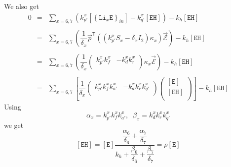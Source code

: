 \documentclass[aps,onecolumn,11pt]{revtex4}
\newcommand{\mychem}[1]{\mathtt{#1}}
\newcommand{\myconc}[1]{\left\lbrack{#1}\right\rbrack}
\newcommand{\LiEin}[1]{\myconc{\left\lbrace\mychem{Li}_{#1}\mychem{E}\right\rbrace_{in}}}
\newcommand{\EHin}{\myconc{\mychem{EH}}}
\newcommand{\Eout}{\myconc{\mychem{E}}}
\newcommand{\mytrn}[1]{{#1}^{\mathsf{T}}}
\begin{document}
We also get
\begin{equation}
	\begin{array}{rcl}
	0 & = & \displaystyle\sum_{x=6,7}\left( k_{p'}^x \LiEin{x} - k_{q'}^x \EHin \right) - k_h \EHin\\
	\\
	  & = & \displaystyle\sum_{x=6,7}\left(\dfrac{1}{\delta_x} \mytrn{\vec{p}} 
	  \left(
	  	(k_{p'}^xS_x - \delta_x I_2) \kappa_x
	  \right) \vec{\mathcal{E}} \right) - k_h \EHin\\
	  \\
	  & = & \displaystyle\sum_{x=6,7}\left( \dfrac{1}{\delta_x} 
	  \begin{pmatrix}
	  k_{p'}^x k_f^x & -k_d^x k_r^x\\
	  \end{pmatrix}
	  \kappa_x\vec{\mathcal{E}} 
	  \right)- k_h \EHin\\
	  \\
	  & = & \displaystyle\sum_{x=6,7} \left\lbrack \dfrac{1}{\delta_x}
	  \begin{pmatrix}
	  k_{p'}^x k_f^x k_{a'}^x & -k_d^x k_r^x k_{q'}^x\\
	  \end{pmatrix} 
	  \begin{pmatrix}
	  \Eout\\
	  \EHin\\
	  \end{pmatrix}
	  \right\rbrack - k_h \EHin
	\end{array}
\end{equation}
Using
\begin{equation}
	\alpha_x = k_{p'}^x k_f^x k_{a'}^x,\;\;\beta_x=k_d^x k_r^x k_{q'}^x
\end{equation}
we get
\begin{equation}
	\EHin = \Eout
	\dfrac{\dfrac{\alpha_6}{\delta_6}+\dfrac{\alpha_7}{\delta_7}}
	{k_h+\dfrac{\beta_6}{\delta_6}+\dfrac{\beta_7}{\delta_7}}
	= \rho \Eout
\end{equation}
\end{document}
